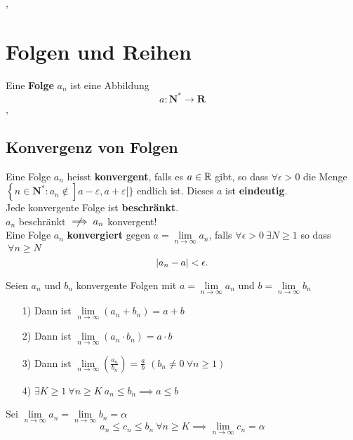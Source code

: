 \sep
\section{Folgen und Reihen}

\Def[2.1.1] Eine \textbf{Folge} $a_n$ ist eine Abbildung
\[
a: \mathbf{N}^{*} \longrightarrow \mathbf{R}
\] 
\sep
\subsection{Konvergenz von Folgen}

\Def[2.1.4] Eine Folge $a_n$ heisst \textbf{konvergent}, falls es $a \in \mathbb{R}$ gibt, so dass $\forall \epsilon > 0$ die Menge
$
\left\{n \in \mathbf{N}^{*}: a_{n} \notin\right] a-\varepsilon, a+\varepsilon[\}
$ endlich ist.
\Lemma[2.1.3] Dieses $a$ ist \textbf{eindeutig}. \\

\Lemma[2.1.5] Jede konvergente Folge ist \textbf{beschränkt}. \\
\Achtung $a_{n}$ beschränkt $\centernot\implies a_{n}$ konvergent! \\

\Lemma[2.1.6] Eine Folge $a_n$ \textbf{konvergiert} gegen ${a = \lim\limits_{n \rightarrow \infty} a_{n}}$, falls $ \forall \epsilon > 0 \ \exists N \geq 1$ so dass $\ \forall n\geq N$
\[
 \left\lvert a_n-a \right\rvert < \epsilon.
\]

\Satz[2.1.8] Seien $a_n$ und $b_n$ konvergente Folgen mit $a = \lim\limits_{n \rightarrow \infty} a_{n}$ und  $b = \lim\limits_{n \rightarrow \infty} b_{n}$
\begin{enumerate}
\item[1)] Dann ist $\lim\limits_{n \rightarrow \infty} (a_{n} + b_{n}) = a + b$
\item[2)] Dann ist $\lim\limits_{n \rightarrow \infty} (a_{n} \cdot b_{n}) = a \cdot b$
\item[3)] Dann ist $\lim\limits_{n \rightarrow \infty} (\frac{a_{n}}{b_{n}}) = \frac{a}{b}$ $(b_{n} \neq 0 \ \forall n \geq 1)$
\item[4)] $\exists K \geq 1 \ \forall n \geq K \ a_{n} \leq b_{n} \implies a \leq b$

\end{enumerate}

 Sei $\lim\limits_{n \rightarrow \infty} a_{n} = \lim\limits_{n \rightarrow \infty} b_{n} = \alpha$ 
\[
a_{n} \leq c_{n} \leq b_{n} \ \forall n \geq K \implies \lim\limits_{n \rightarrow \infty} c_{n} = \alpha
\]

